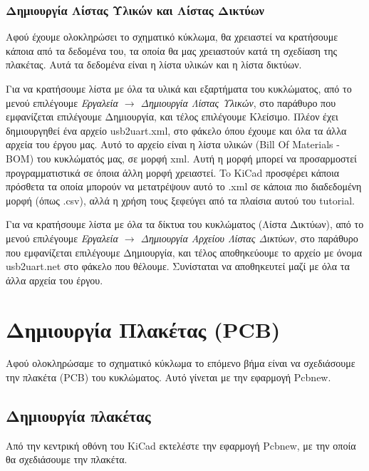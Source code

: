 \documentclass[a4paper]{article}
\begin{document}

\subsubsection{Δημιουργία Λίστας Υλικών και Λίστας Δικτύων}
Αφού έχουμε ολοκληρώσει το σχηματικό κύκλωμα, θα χρειαστεί να κρατήσουμε κάποια από τα δεδομένα του, τα οποία θα μας χρειαστούν κατά τη σχεδίαση της πλακέτας. Αυτά τα δεδομένα είναι η λίστα υλικών και η λίστα δικτύων.

Για να κρατήσουμε λίστα με όλα τα υλικά και εξαρτήματα του κυκλώματος, από το μενού επιλέγουμε \textit{Εργαλεία $\rightarrow$ Δημιουργία Λίστας Υλικών}, στο παράθυρο που εμφανίζεται επιλέγουμε Δημιουργία, και τέλος επιλέγουμε Κλείσιμο. Πλέον έχει δημιουργηθεί ένα αρχείο usb2uart.xml, στο φάκελο όπου έχουμε και όλα τα άλλα αρχεία του έργου μας. Αυτό το αρχείο είναι η λίστα υλικών (Bill Of Materials - BOM) του κυκλώματός μας, σε μορφή xml. Αυτή η μορφή μπορεί να προσαρμοστεί προγραμματιστικά σε όποια άλλη μορφή χρειαστεί. To KiCad προσφέρει κάποια πρόσθετα τα οποία μπορούν να μετατρέψουν αυτό το .xml σε κάποια πιο διαδεδομένη μορφή (όπως .csv), αλλά η χρήση τους ξεφεύγει από τα πλαίσια αυτού του tutorial.

Για να κρατήσουμε λίστα με όλα τα δίκτυα του κυκλώματος (Λίστα Δικτύων), από το μενού επιλέγουμε \textit{Εργαλεία $\rightarrow$ Δημιουργία Αρχείου Λίστας Δικτύων}, στο παράθυρο που εμφανίζεται επιλέγουμε Δημιουργία, και τέλος αποθηκεύουμε το αρχείο με όνομα usb2uart.net στο φάκελο που θέλουμε. Συνίσταται να αποθηκευτεί μαζί με όλα τα άλλα αρχεία του έργου.


\newpage
\section{Δημιουργία Πλακέτας (PCB)}
Αφού ολοκληρώσαμε το σχηματικό κύκλωμα το επόμενο βήμα είναι να σχεδιάσουμε την πλακέτα (PCB) του κυκλώματος. Αυτό γίνεται με την εφαρμογή Pcbnew.

\subsection{Δημιουργία πλακέτας}
Από την κεντρική οθόνη του \textenglish{KiCad} εκτελέστε την εφαρμογή Pcbnew, με την οποία θα σχεδιάσουμε την πλακέτα.
\end{document}
